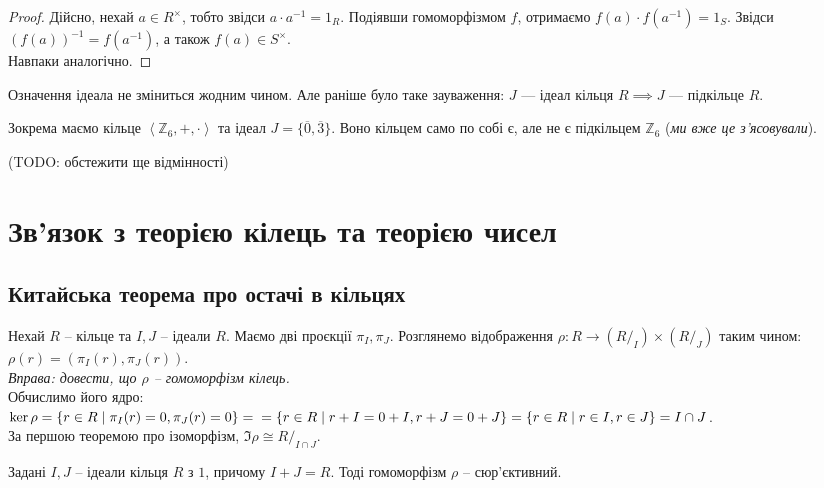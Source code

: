 \documentclass{math_library}
\begin{document}
\begin{proof}
Дійсно, нехай $a \in R^\times$, тобто звідси $a \cdot a^{-1} = 1_R$. Подіявши гомоморфізмом $f$, отримаємо $f(a) \cdot f(a^{-1}) = 1_S$. Звідси $(f(a))^{-1} = f(a^{-1})$, а також $f(a) \in S^\times$.\\
Навпаки аналогічно.
\end{proof}

Означення ідеала не зміниться жодним чином. Але раніше було таке зауваження: $J$ --- ідеал кільця $R \implies J$ --- підкільце $R$. \color{red}{Зараз це вже --- неправда.}
\color{black}{}

\begin{example}
Зокрема маємо кільце $\left< \mathbb{Z}_6, +, \cdot \right>$ та ідеал $J = \{\overline{0},\overline{3}\}$. Воно кільцем само по собі є, але не є підкільцем $\mathbb{Z}_6$ (\textit{ми вже це з'ясовували}).
\end{example}

(TODO: обстежити ще відмінності)
\newpage

\fi

\iffalse
\section{Зв'язок з теорією кілець та теорією чисел}
\subsection{Китайська теорема про остачі в кільцях}
Нехай $R$ -- кільце та $I,J$ -- ідеали $R$. Маємо дві проєкції $\pi_I, \pi_J$. Розглянемо відображення $\rho \colon R \to (R/_I) \times (R/_J)$ таким чином:\\
$\rho(r) = (\pi_I(r),\pi_J(r))$.\\
\textit{Вправа: довести, що $\rho$ -- гомоморфізм кілець.}\\
Обчислимо його ядро:\\
$\ker \rho = \{r \in R \mid \pi_I(r) = 0, \pi_J(r) = 0\} = \\ = \{r \in R \mid r+I = 0+I, r+J = 0+J\} = \{r \in R \mid r \in I, r \in J\} = I \cap J$.\\
За першою теоремою про ізоморфізм, $\Im \rho \cong R/_{I \cap J}$.

\begin{proposition}
Задані $I,J$ -- ідеали кільця $R$ з $1$, причому $I+J = R$. Тоді гомоморфізм $\rho$ -- сюр'єктивний.
\end{proposition}
\end{document}
